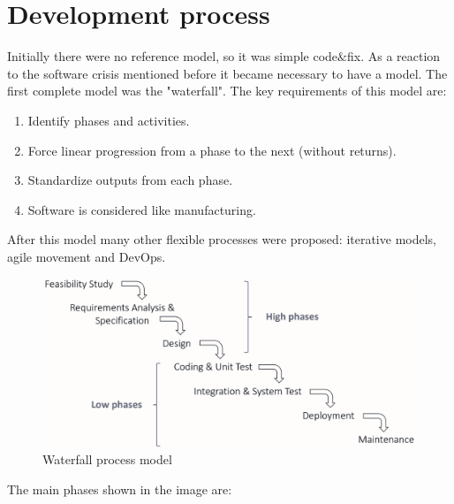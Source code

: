 \documentclass[12pt, a4paper]{report}
\newtheorem[style=M,bodystyle=\normalfont]{theorem}{Theorem}
\newtheorem[style=M,bodystyle=\normalfont]{corollary}{Corollary}
\newtheorem[style=M,bodystyle=\normalfont]{lemma}{Lemma}
\newtheorem[style=M,bodystyle=\normalfont]{definition}{Definition}
\begin{document}
    \section{Development process}
    Initially there were no reference model, so it was simple code$\&$fix. As a reaction to the software crisis mentioned before it 
    became necessary to have a model. The first complete model was the "waterfall". The key requirements of this model are:
    \begin{enumerate}
        \item Identify phases and activities.
        \item Force linear progression from a phase to the next (without returns).
        \item Standardize outputs from each phase.
        \item Software is considered like manufacturing.
    \end{enumerate}
    After this model many other flexible processes were proposed: iterative models, agile movement and DevOps.
    \begin{figure}[H]
        \centering
        \includegraphics[width=0.75\linewidth]{images/waterfall.png}
        \caption{Waterfall process model}
    \end{figure}
    The main phases shown in the image are:
\end{document}
